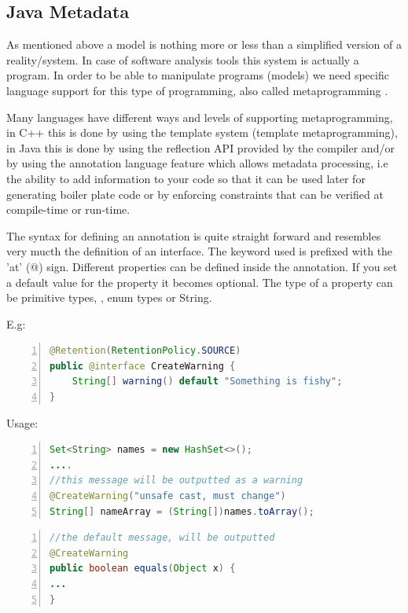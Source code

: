 		
\subsection{Java Metadata}\label{ch:2.1.2}

	
	As mentioned above a model is nothing more or less than a simplified version of
a reality/system. In case of software analysis tools this system is actually a
program. In order to be able to manipulate programs (models) we need specific
language support for this type of programming, also called metaprogramming
\cite{website:metaprogramming}. 

	Many languages have different ways and levels of supporting metaprogramming,
in C++ this is done by using the template system (template metaprogramming), in
Java this is done by using the reflection API provided by the compiler and/or by using the annotation
language feature which allows metadata processing, i.e the ability to add
information to your code so that it can be used later for generating boiler
plate code or by enforcing constraints that can be verified at compile-time or
run-time. \cite{book:ThinkingInJava} 
	
	The syntax for defining an annotation is quite straight forward and resembles
very mucth the definition of an interface. The keyword used is 
prefixed with the 'at' (@) sign. Different properties can be defined inside the annotation. If you set a default
value for the property it becomes optional. The type of a property can be 
primitive types, , enum types or String.
	
	E.g:
	
	
	\small
	\begin{lstlisting}[language=Java,numbers=left]
	@Retention(RetentionPolicy.SOURCE)
public @interface CreateWarning {
	String[] warning() default "Something is fishy"; 
}
	\end{lstlisting}
	\normalsize{}
	
	Usage:
	
	
	\small
	\begin{lstlisting}[language=Java,numbers=left]
Set<String> names = new HashSet<>();
....
//this message will be outputted as a warning
@CreateWarning("unsafe cast, must change")
String[] nameArray = (String[])names.toArray();
	\end{lstlisting}
	\normalsize{}
	
	\small
	\begin{lstlisting}[language=Java,numbers=left]
//the default message, will be outputted
@CreateWarning
public boolean equals(Object x) {
...
}
	\end{lstlisting}
	\normalsize{}
	

